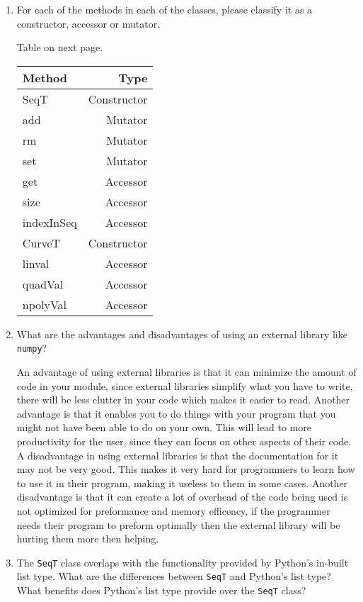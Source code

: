 \documentclass[12pt]{article}
\begin{document}
\begin{enumerate}

\item For each of the methods in each of the classes, please classify it as a
  constructor, accessor or mutator.

Table on next page.
\begin{table}[h]
	\begin{tabular}{lr}
		\toprule
		Method & Type\\
		\midrule
		SeqT & Constructor\\
		add & Mutator\\
		rm & Mutator\\
		set & Mutator\\
		get & Accessor\\
		size & Accessor\\
		indexInSeq & Accessor\\
		CurveT & Constructor\\
		linval & Accessor\\
		quadVal & Accessor\\
		npolyVal & Accessor\\
		\bottomrule
	\end{tabular}
\end{table}

\item What are the advantages and disadvantages of using an external library
  like \texttt{numpy}?

An advantage of using external libraries is that it can minimize the amount of 
code in your module, since external libraries simplify what you have to write,
there will be less clutter in your code which makes it easier to read. Another 
advantage is that it enables you to do things with your program that you might
not have been able to do on your own. This will lead to more productivity for the
user, since they can focus on other aspects of their code. A disadvantage in using external libraries
is that the documentation for it may not be very good. This makes it very hard
for programmers to learn how to use it in their program, making it useless to 
them in some cases. Another disadvantage is that it can create a lot of overhead
of the code being used is not optimized for preformance and memory efficency, if
the programmer needs their program to preform optimally then the external library
will be hurting them more then helping.

\item The \texttt{SeqT} class overlaps with the functionality provided by
  Python's in-built list type.  What are the differences between \texttt{SeqT}
  and Python's list type?  What benefits does Python's list type provide over
  the \texttt{SeqT} class?


\end{enumerate}
\end{document}

